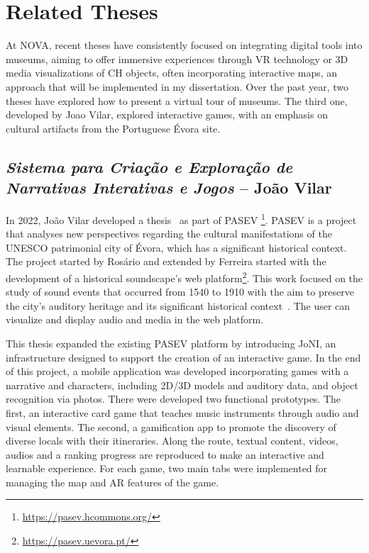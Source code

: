 \section{Related Theses}
\label{sec:thesis_nova}


At NOVA, recent theses have consistently focused on integrating digital tools into museums, aiming to offer immersive experiences through \gls{VR} technology or \gls{3D} media visualizations 
of \gls{CH} objects, often incorporating interactive maps, an approach that will be implemented in my dissertation. Over the past year, two theses have explored how to 
present a virtual tour of museums. The third one, developed by Joao Vilar, explored interactive games, with an emphasis on cultural artifacts from the Portuguese Évora site.


\subsection{\textit{Sistema para Criação e Exploração de Narrativas Interativas e Jogos} – João Vilar}
\label{sec:thesis1_nova}


In 2022, João Vilar developed a thesis~\cite{tese_jogosVilar2022} as part of \gls{PASEV} \footnote{\url{https://pasev.hcommons.org/}}. \gls{PASEV} is a project that analyses new perspectives regarding the cultural manifestations of the UNESCO patrimonial city of Évora,
which has a significant historical context. The project started by Rosário and extended by Ferreira started with the development of a historical soundscape's web platform\footnote{\url{https://pasev.uevora.pt/}}. 
This work focused on the study of sound events that occurred from 1540 to 1910 with the aim to preserve the city's auditory heritage and its significant historical context~\cite{rodrigues2021using}. The user can
visualize and display audio and media in the web platform.

  
This thesis expanded the existing \gls{PASEV} platform by introducing JoNI, an infrastructure designed to support the creation of an interactive game. In the end of this project, a mobile 
application was developed incorporating games with a narrative and characters, including \gls{2D}/\gls{3D} models and auditory data, and object recognition via photos. There were developed two 
functional prototypes. The first, an interactive card game that teaches music instruments through audio and visual elements. The second, a gamification app to promote the discovery 
of diverse locals with their itineraries.  Along the route, textual content, videos, audios and a ranking progress are reproduced to make an interactive and learnable experience. 
For each game, two main tabs were implemented for managing the map and \gls{AR} features of the game. 

